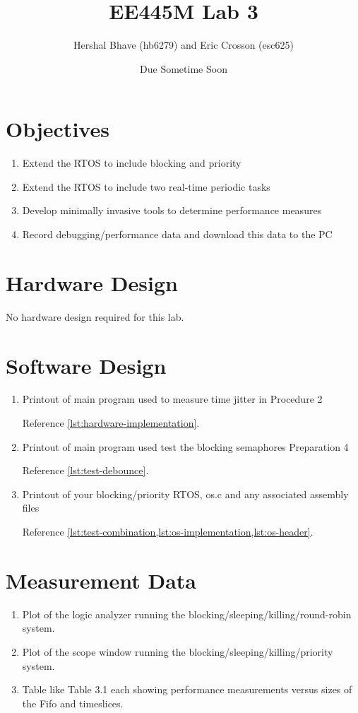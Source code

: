 \documentclass[12pt]{article}
\title{EE445M Lab 3}
\author{Hershal Bhave (hb6279) and Eric Crosson (esc625)}
\date{Due Sometime Soon}
\begin{document}
\maketitle

\section{Objectives}
\begin{enumerate}
\item Extend the RTOS to include blocking and priority
\item Extend the RTOS to include two real-time periodic tasks
\item Develop minimally invasive tools to determine performance
  measures
\item Record debugging/performance data and download this data to the
  PC
\end{enumerate}

\section{Hardware Design}
No hardware design required for this lab.

\section{Software Design}
\begin{enumerate}
\item Printout of main program used to measure time jitter in
  Procedure 2

Reference \cref{lst:hardware-implementation}.
\item Printout of main program used test the blocking semaphores Preparation 4

Reference \cref{lst:test-debounce}.
\item Printout of your blocking/priority RTOS, os.c and any associated assembly files

Reference \cref{lst:test-combination,lst:os-implementation,lst:os-header}.
\end{enumerate}
\section{Measurement Data}
\begin{enumerate}
\item Plot of the logic analyzer running the
  blocking/sleeping/killing/round-robin system.
\item Plot of the scope window running the
  blocking/sleeping/killing/priority system.
\item Table like Table 3.1 each showing performance measurements
  versus sizes of the Fifo and timeslices.
\end{enumerate}
\end{document}

